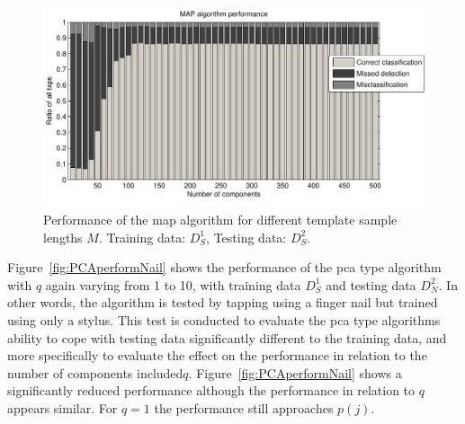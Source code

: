 \begin{figure}[!] %
\centering
\includegraphics[width=150mm]{MAPperformLength.pdf}
\caption{Performance of the \DIFdelbeginFL {}\DIFdelendFL \DIFaddbeginFL \gls{map} \DIFaddendFL algorithm for different template sample lengths $M$\DIFdelbeginFL {}\DIFdelendFL . Training data: $D^1_S$, Testing data: $D^2_S$.}\label{fig:MAPperformLength}
\end{figure}

Figure~\ref{fig:PCAperformNail} shows the performance of the \DIFdelbegin {}\DIFdelend \DIFaddbegin \gls{pca} \DIFaddend type algorithm with $q$ again varying from 1 to 10, with training data $D^1_S$ and testing data $D^2_N$. In other words, the algorithm is tested by tapping using a finger nail but trained using only a stylus. This test is conducted to evaluate the \DIFdelbegin {}\DIFdelend \DIFaddbegin \gls{pca} \DIFaddend type algorithms ability to cope with testing data significantly different to the training data, and more specifically to evaluate the effect on the performance in relation to the number of components included\DIFaddbegin \DIFadd{, }\DIFaddend $q$. Figure~\ref{fig:PCAperformNail} shows a significantly reduced performance although the performance in relation to $q$ appears similar. For $q=1$ the performance still approaches $p(j)$.

